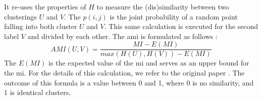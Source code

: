 \begin{enumerate}
\begin{equation}
        \end{equation}
        It re-uses the properties of $H$ to measure the (dis)similarity between two clusterings $U$ and $V$.
        The $p(i,j)$ is the joint probability of a random point falling into both cluster $U$ and $V$.
        This same calculation is executed for the second label $V$ and divided by each other.
        The \gls{ami} is formulated as follows \citep{vinh_information_nodate}:
        \begin{equation}
          AMI (U, V)  = \frac{MI - E(MI)}{max(H(U), H(V)) - E(MI)}
        \end{equation}
        The $E(MI)$ is the expected value of the \gls{mi} and serves as an upper bound for the \gls{mi}.
        For the details of this calculation, we refer to the original paper \citep{vinh_information_nodate}.
        The outcome of this formula is a value between 0 and 1, where 0 is no similarity, and 1 is identical clusters.
\end{enumerate}
